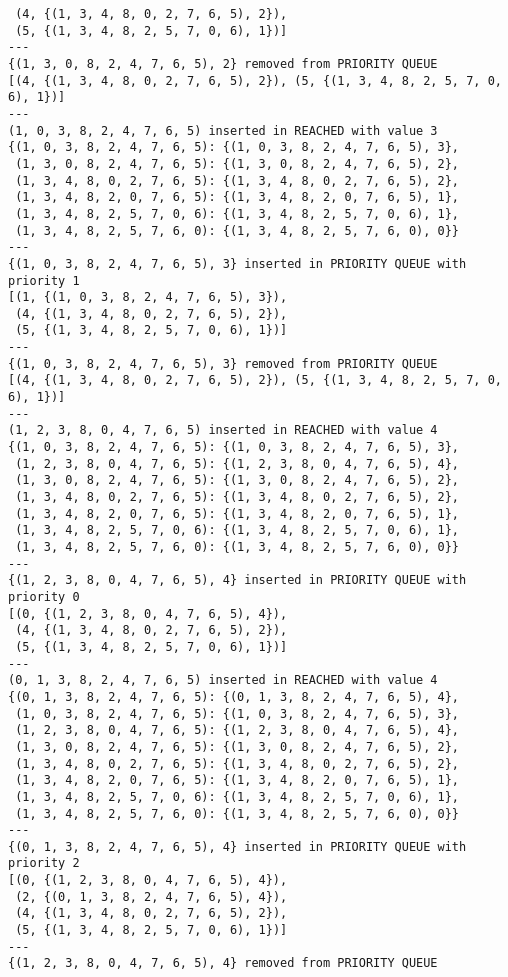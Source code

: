 \documentclass{article}
\begin{document}
\begin{verbatim}
 (4, {(1, 3, 4, 8, 0, 2, 7, 6, 5), 2}),
 (5, {(1, 3, 4, 8, 2, 5, 7, 0, 6), 1})]
---
{(1, 3, 0, 8, 2, 4, 7, 6, 5), 2} removed from PRIORITY QUEUE
[(4, {(1, 3, 4, 8, 0, 2, 7, 6, 5), 2}), (5, {(1, 3, 4, 8, 2, 5, 7, 0, 6), 1})]
---
(1, 0, 3, 8, 2, 4, 7, 6, 5) inserted in REACHED with value 3
{(1, 0, 3, 8, 2, 4, 7, 6, 5): {(1, 0, 3, 8, 2, 4, 7, 6, 5), 3},
 (1, 3, 0, 8, 2, 4, 7, 6, 5): {(1, 3, 0, 8, 2, 4, 7, 6, 5), 2},
 (1, 3, 4, 8, 0, 2, 7, 6, 5): {(1, 3, 4, 8, 0, 2, 7, 6, 5), 2},
 (1, 3, 4, 8, 2, 0, 7, 6, 5): {(1, 3, 4, 8, 2, 0, 7, 6, 5), 1},
 (1, 3, 4, 8, 2, 5, 7, 0, 6): {(1, 3, 4, 8, 2, 5, 7, 0, 6), 1},
 (1, 3, 4, 8, 2, 5, 7, 6, 0): {(1, 3, 4, 8, 2, 5, 7, 6, 0), 0}}
---
{(1, 0, 3, 8, 2, 4, 7, 6, 5), 3} inserted in PRIORITY QUEUE with priority 1
[(1, {(1, 0, 3, 8, 2, 4, 7, 6, 5), 3}),
 (4, {(1, 3, 4, 8, 0, 2, 7, 6, 5), 2}),
 (5, {(1, 3, 4, 8, 2, 5, 7, 0, 6), 1})]
---
{(1, 0, 3, 8, 2, 4, 7, 6, 5), 3} removed from PRIORITY QUEUE
[(4, {(1, 3, 4, 8, 0, 2, 7, 6, 5), 2}), (5, {(1, 3, 4, 8, 2, 5, 7, 0, 6), 1})]
---
(1, 2, 3, 8, 0, 4, 7, 6, 5) inserted in REACHED with value 4
{(1, 0, 3, 8, 2, 4, 7, 6, 5): {(1, 0, 3, 8, 2, 4, 7, 6, 5), 3},
 (1, 2, 3, 8, 0, 4, 7, 6, 5): {(1, 2, 3, 8, 0, 4, 7, 6, 5), 4},
 (1, 3, 0, 8, 2, 4, 7, 6, 5): {(1, 3, 0, 8, 2, 4, 7, 6, 5), 2},
 (1, 3, 4, 8, 0, 2, 7, 6, 5): {(1, 3, 4, 8, 0, 2, 7, 6, 5), 2},
 (1, 3, 4, 8, 2, 0, 7, 6, 5): {(1, 3, 4, 8, 2, 0, 7, 6, 5), 1},
 (1, 3, 4, 8, 2, 5, 7, 0, 6): {(1, 3, 4, 8, 2, 5, 7, 0, 6), 1},
 (1, 3, 4, 8, 2, 5, 7, 6, 0): {(1, 3, 4, 8, 2, 5, 7, 6, 0), 0}}
---
{(1, 2, 3, 8, 0, 4, 7, 6, 5), 4} inserted in PRIORITY QUEUE with priority 0
[(0, {(1, 2, 3, 8, 0, 4, 7, 6, 5), 4}),
 (4, {(1, 3, 4, 8, 0, 2, 7, 6, 5), 2}),
 (5, {(1, 3, 4, 8, 2, 5, 7, 0, 6), 1})]
---
(0, 1, 3, 8, 2, 4, 7, 6, 5) inserted in REACHED with value 4
{(0, 1, 3, 8, 2, 4, 7, 6, 5): {(0, 1, 3, 8, 2, 4, 7, 6, 5), 4},
 (1, 0, 3, 8, 2, 4, 7, 6, 5): {(1, 0, 3, 8, 2, 4, 7, 6, 5), 3},
 (1, 2, 3, 8, 0, 4, 7, 6, 5): {(1, 2, 3, 8, 0, 4, 7, 6, 5), 4},
 (1, 3, 0, 8, 2, 4, 7, 6, 5): {(1, 3, 0, 8, 2, 4, 7, 6, 5), 2},
 (1, 3, 4, 8, 0, 2, 7, 6, 5): {(1, 3, 4, 8, 0, 2, 7, 6, 5), 2},
 (1, 3, 4, 8, 2, 0, 7, 6, 5): {(1, 3, 4, 8, 2, 0, 7, 6, 5), 1},
 (1, 3, 4, 8, 2, 5, 7, 0, 6): {(1, 3, 4, 8, 2, 5, 7, 0, 6), 1},
 (1, 3, 4, 8, 2, 5, 7, 6, 0): {(1, 3, 4, 8, 2, 5, 7, 6, 0), 0}}
---
{(0, 1, 3, 8, 2, 4, 7, 6, 5), 4} inserted in PRIORITY QUEUE with priority 2
[(0, {(1, 2, 3, 8, 0, 4, 7, 6, 5), 4}),
 (2, {(0, 1, 3, 8, 2, 4, 7, 6, 5), 4}),
 (4, {(1, 3, 4, 8, 0, 2, 7, 6, 5), 2}),
 (5, {(1, 3, 4, 8, 2, 5, 7, 0, 6), 1})]
---
{(1, 2, 3, 8, 0, 4, 7, 6, 5), 4} removed from PRIORITY QUEUE

\end{verbatim}
\end{document}
